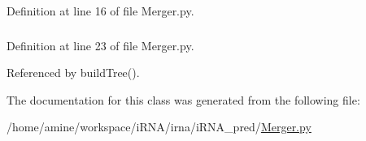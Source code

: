 \-Definition at line 16 of file \-Merger.\-py.

\hypertarget{classirna_1_1iRNA__pred_1_1Merger_1_1Merger_a64c835ab8723a4fc6ad13b3628792eb2}{
\subsubsection[{softprevious}]{}}
\label{classirna_1_1iRNA__pred_1_1Merger_1_1Merger_a64c835ab8723a4fc6ad13b3628792eb2}


\-Definition at line 23 of file \-Merger.\-py.



\-Referenced by build\-Tree().



\-The documentation for this class was generated from the following file\-:\begin{DoxyCompactItemize}
\item 
/home/amine/workspace/i\-R\-N\-A/irna/i\-R\-N\-A\-\_\-pred/\hyperlink{Merger_8py}{\-Merger.\-py}\end{DoxyCompactItemize}

